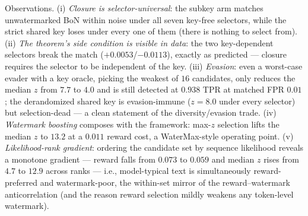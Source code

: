 \documentclass{article} %
\begin{document}
Observations. (i) \emph{Closure is selector-universal}: the subkey arm matches
unwatermarked BoN within noise under all seven key-free selectors, while the
strict shared key loses under every one of them (there is nothing to select
from). (ii) \emph{The theorem's side condition is visible in data}: the two
key-dependent selectors break the match ($+0.0053$/$-0.0113$), exactly as
predicted --- closure requires the selector to be independent of the key.
(iii) \emph{Evasion}: even a worst-case evader with a key oracle, picking the
weakest of $16$ candidates, only reduces the median $z$ from $7.7$ to $4.0$ and
is still detected at $0.938$ TPR at matched FPR $0.01$; the derandomized shared
key is evasion-immune ($z{=}8.0$ under every selector) but selection-dead ---
a clean statement of the diversity/evasion trade.
(iv) \emph{Watermark boosting} composes with the framework: max-$z$ selection
lifts the median $z$ to $13.2$ at a $0.011$ reward cost, a WaterMax-style
operating point. (v) \emph{Likelihood-rank gradient}: ordering the candidate set by sequence
likelihood reveals a monotone gradient --- reward falls from $0.073$ to
$0.059$ and median $z$ rises from $4.7$ to $12.9$ across ranks --- i.e.,
model-typical text is simultaneously reward-preferred and watermark-poor, the
within-set mirror of the reward--watermark anticorrelation (and the reason
reward selection mildly weakens any token-level watermark).
\end{document}

